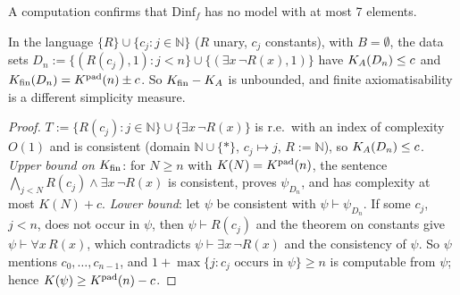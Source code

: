 A computation confirms that $\mathrm{Dinf}_f$ has no model with at most 7 elements.

\begin{remark}\label{rem:terms:named}
In the language $\{R\}\cup\{c_j:j\in\mathbb N\}$ ($R$ unary, $c_j$ constants), with $B=\emptyset$, the data sets $D_n:=\{(R(c_j),1):j<n\}\cup\{(\exists x\,\neg R(x),1)\}$ have $K_{A}(D_n)\le c$ and $K_{\mathrm{fin}}(D_n)=K^{\mathrm{pad}}(n)\pm c$. So $K_{\mathrm{fin}}-K_{A}$ is unbounded, and finite axiomatisability is a different simplicity measure.
\end{remark}

\begin{proof}
$T:=\{R(c_j):j\in\mathbb N\}\cup\{\exists x\,\neg R(x)\}$ is r.e.\ with an index of complexity $O(1)$ and is consistent (domain $\mathbb N\cup\{*\}$, $c_j\mapsto j$, $R:=\mathbb N$), so $K_{A}(D_n)\le c$. \emph{Upper bound on $K_{\mathrm{fin}}$}: for $N\ge n$ with $K(N)=K^{\mathrm{pad}}(n)$, the sentence $\bigwedge_{j<N}R(c_j)\wedge\exists x\,\neg R(x)$ is consistent, proves $\psi_{D_n}$, and has complexity at most $K(N)+c$. \emph{Lower bound}: let $\psi$ be consistent with $\psi\vdash\psi_{D_n}$. If some $c_j$, $j<n$, does not occur in $\psi$, then $\psi\vdash R(c_j)$ and the theorem on constants give $\psi\vdash\forall x\,R(x)$, which contradicts $\psi\vdash\exists x\,\neg R(x)$ and the consistency of $\psi$. So $\psi$ mentions $c_0,\dots,c_{n-1}$, and $1+\max\{j:c_j\text{ occurs in }\psi\}\ge n$ is computable from $\psi$; hence $K(\psi)\ge K^{\mathrm{pad}}(n)-c$.
\end{proof}

